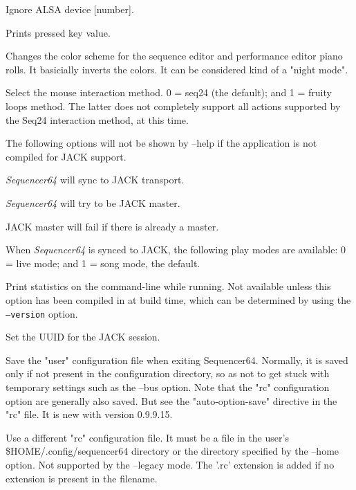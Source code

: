       Ignore ALSA device [number].

      Prints pressed key value.

      Changes the color scheme for the sequence editor and performance editor
      piano rolls.  It basicially inverts the colors.  It can be considered
      kind of a "night mode".

      Select the mouse interaction method.
      0 = seq24 (the default); and 1 = fruity loops method.
      The latter does not completely support all actions supported by the Seq24
      interaction method, at this time.

      The following options will not be shown by --help if the application is
      not compiled for JACK support.

      \textsl{Sequencer64} will sync to JACK transport.

      \textsl{Sequencer64} will try to be JACK master.

      JACK master will fail if there is already a master.

      When \textsl{Sequencer64} is synced to JACK, the following play modes
      are available: 0 = live mode; and 1 = song mode, the default.

      Print statistics on the command-line while running.
      Not available unless this option has been compiled in at build time,
      which can be determined by using the \texttt{--version} option.

      Set the UUID for the JACK session.

      Save the "user" configuration file when exiting Sequencer64.
      Normally, it is saved only if not present in the configuration directory,
      so as not to get stuck with temporary settings such as the --bus option.
      Note that the "rc" configuration option are generally also saved.
      But see the "auto-option-save" directive in the "rc" file.
      It is new with version 0.9.9.15.

      Use a different "rc" configuration file.  It must be a file in the user's
      \$HOME/.config/sequencer64 directory or the directory specified by the
      --home option.  Not supported by the --legacy mode.  The '.rc' extension
      is added if no extension is present in the filename.


